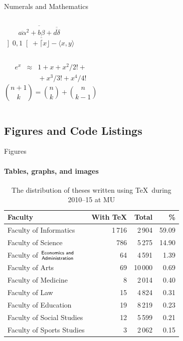 \documentclass{beamer}
\begin{document}
\begin{darkframes}
\begin{frame}[label=math]{Numerals and Mathematics}
\begin{columns}[onlytextwidth]
          $$\overline{\overline{a\alpha}^2+\underline{b\beta}
           +\overline{\overline{d\delta}}}$$
          $\left] 0,1\right[ + \lceil x \rfloor - \langle x,y\rangle$
      \end{columns}
      \begin{columns}[onlytextwidth]
          \begin{eqnarray*}
           e^x &\approx& 1+x+x^2/2! + \\
             && {}+x^3/3! + x^4/4!
          \end{eqnarray*}
          $${n+1\choose k} = {n\choose k} + {n \choose k-1}$$
      \end{columns}
    \end{frame}

    \subsection{Figures and Code Listings}
    \begin{frame}[label=figs1]{Figures}
      \framesubtitle{Tables, graphs, and images}
      \begin{table}[!b]
        {\carlitoTLF %
        \begin{tabularx}{\textwidth}{Xrrr}
          \textbf{Faculty} & \textbf{With \TeX} & \textbf{Total} &
          \textbf{\%} \\
          \toprule
          Faculty of Informatics       & 1\,716  & 2\,904  &
          59.09 \\%
          Faculty of Science           & 786     & 5\,275  &
          14.90 \\%
          Faculty of $\genfrac{}{}{0pt}{}{\textsf{Economics and}}{%
          \textsf{Administration}}$    & 64      & 4\,591  &
          1.39  \\%
          Faculty of Arts              & 69      & 10\,000 &
          0.69  \\%
          Faculty of Medicine          & 8       & 2\,014  &
          0.40  \\%
          Faculty of Law               & 15      & 4\,824  &
          0.31  \\%
          Faculty of Education         & 19      & 8\,219  &
          0.23  \\%
          Faculty of Social Studies    & 12      & 5\,599  &
          0.21  \\%
          Faculty of Sports Studies    & 3       & 2\,062  &
          0.15  \\%
          \bottomrule
        \end{tabularx}}
        \caption{The distribution of theses written using \TeX\ during 2010--15 at MU}
      \end{table}
    \end{frame}


\end{darkframes}
\end{document}
